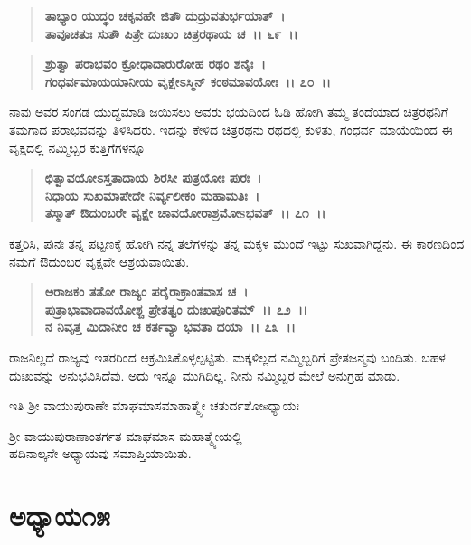 \begin{verse}
\textbf{ತಾಭ್ಯಾಂ ಯುದ್ಧಂ ಚಕೃವಹೇ ಜಿತೌ ದುದ್ರುವತುರ್ಭಯಾತ್~।}\\\textbf{ತಾವೂಚತುಃ ಸುತೌ ಪಿತ್ರೇ ದುಃಖಂ ಚಿತ್ರರಥಾಯ ಚ~।। ೬೯~।।} 
\end{verse}

\begin{verse}
\textbf{ಶ್ರುತ್ವಾ ಪರಾಭವಂ ಕ್ರೋಧಾದಾರುರೋಹ ರಥಂ ಶನೈಃ~।}\\\textbf{ಗಂಧರ್ವಮಾಯಯಾನೀಯ ವೃಕ್ಷೇಽಸ್ಮಿನ್ ಕಂಠಮಾವಯೋಃ~।। ೭೦~।।}
\end{verse}

ನಾವು ಅವರ ಸಂಗಡ ಯುದ್ಧಮಾಡಿ ಜಯಿಸಲು ಅವರು ಭಯದಿಂದ ಓಡಿ ಹೋಗಿ ತಮ್ಮ ತಂದೆಯಾದ ಚಿತ್ರರಥನಿಗೆ ತಮಗಾದ ಪರಾಭವವನ್ನು ತಿಳಿಸಿದರು. ಇದನ್ನು ಕೇಳಿದ ಚಿತ್ರರಥನು ರಥದಲ್ಲಿ ಕುಳಿತು, ಗಂಧರ್ವ ಮಾಯೆಯಿಂದ ಈ ವೃಕ್ಷದಲ್ಲಿ ನಮ್ಮಿಬ್ಬರ ಕುತ್ತಿಗೆಗಳನ್ನೂ

\begin{verse}
\textbf{ಛಿತ್ವಾವಯೋಽಸ್ತತಾದಾಯ ಶಿರಸೀ ಪುತ್ರಯೋಃ ಪುರಃ~।}\\\textbf{ನಿಧಾಯ ಸುಖಮಾಪೇದೇ ನಿರ್ವ್ಯಲೀಕಂ ಮಹಾಮತಿಃ~।}\\\textbf{ತಸ್ಮಾತ್‌ ಔದುಂಬರೇ ವೃಕ್ಷೇ ಚಾವಯೋರಾಶ್ರಮೋsಭವತ್~।। ೭೧~।।}
\end{verse}

ಕತ್ತರಿಸಿ, ಪುನಃ ತನ್ನ ಪಟ್ಟಣಕ್ಕೆ ಹೋಗಿ ನನ್ನ ತಲೆಗಳನ್ನು ತನ್ನ ಮಕ್ಕಳ ಮುಂದೆ ಇಟ್ಟು ಸುಖವಾಗಿದ್ದನು. ಈ ಕಾರಣದಿಂದ ನಮಗೆ ಔದುಂಬರ ವೃಕ್ಷವೇ ಆಶ್ರಯವಾಯಿತು.

\begin{verse}
\textbf{ಅರಾಜಕಂ ತತೋ ರಾಜ್ಯಂ ಪರೈರಾಕ್ರಾಂತವಾಸ ಚ~।}\\\textbf{ಪುತ್ರಾಭಾವಾದಾವಯೋಶ್ಚ ಪ್ರೇತತ್ವಂ ದುಃಖಪೂರಿತಮ್~।। ೭೨~।।}\\\textbf{ನ ನಿವೃತ್ತ ಮಿದಾನೀಂ ಚ ಕರ್ತವ್ಯಾ ಭವತಾ ದಯಾ~।। ೭೩~।।}
\end{verse}

ರಾಜನಿಲ್ಲದೆ ರಾಜ್ಯವು ಇತರರಿಂದ ಆಕ್ರಮಿಸಿಕೊಳ್ಳಲ್ಪಟ್ಟಿತು. ಮಕ್ಕಳಿಲ್ಲದ ನಮ್ಮಿಬ್ಬರಿಗೆ ಪ್ರೇತಜನ್ಮವು ಬಂದಿತು. ಬಹಳ ದುಃಖವನ್ನು ಅನುಭವಿಸಿದೆವು. ಅದು ಇನ್ನೂ ಮುಗಿದಿಲ್ಲ. ನೀನು ನಮ್ಮಿಬ್ಬರ ಮೇಲೆ ಅನುಗ್ರಹ ಮಾಡು.

\begin{center}
ಇತಿ ಶ‍್ರೀ ವಾಯುಪುರಾಣೇ ಮಾಘಮಾಸಮಾಹಾತ್ಮ್ಯೇ ಚತುರ್ದಶೋsಧ್ಯಾಯಃ 
\end{center}

\begin{center}
ಶ‍್ರೀ ವಾಯುಪುರಾಣಾಂತರ್ಗತ ಮಾಘಮಾಸ ಮಹಾತ್ಮ್ಯೇಯಲ್ಲಿ \\ ಹದಿನಾಲ್ಕನೇ ಅಧ್ಯಾಯವು ಸಮಾಪ್ತಿಯಾಯಿತು.
\end{center}

\newpage

\section*{ಅಧ್ಯಾಯ\enginline{-}೧೫}

